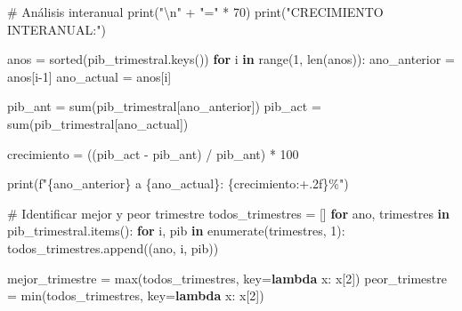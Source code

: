 \documentclass[
  doc,
  floatsintext,
  longtable,
  a4paper,
  nolmodern,
  notxfonts,
  notimes,
  12pt,
  colorlinks=true,linkcolor=blue,citecolor=blue,urlcolor=blue]{apa7}
\newenvironment{Shaded}{\begin{snugshade}}{\end{snugshade}}
\newcommand{\BuiltInTok}[1]{\textcolor[rgb]{0.00,0.23,0.31}{#1}}
\newcommand{\CharTok}[1]{\textcolor[rgb]{0.13,0.47,0.30}{#1}}
\newcommand{\CommentTok}[1]{\textcolor[rgb]{0.37,0.37,0.37}{#1}}
\newcommand{\ControlFlowTok}[1]{\textcolor[rgb]{0.00,0.23,0.31}{\textbf{#1}}}
\newcommand{\DecValTok}[1]{\textcolor[rgb]{0.68,0.00,0.00}{#1}}
\newcommand{\KeywordTok}[1]{\textcolor[rgb]{0.00,0.23,0.31}{\textbf{#1}}}
\newcommand{\NormalTok}[1]{\textcolor[rgb]{0.00,0.23,0.31}{#1}}
\newcommand{\OperatorTok}[1]{\textcolor[rgb]{0.37,0.37,0.37}{#1}}
\newcommand{\SpecialCharTok}[1]{\textcolor[rgb]{0.37,0.37,0.37}{#1}}
\newcommand{\SpecialStringTok}[1]{\textcolor[rgb]{0.13,0.47,0.30}{#1}}
\newcommand{\StringTok}[1]{\textcolor[rgb]{0.13,0.47,0.30}{#1}}
\begin{document}
\begin{Shaded}
\begin{Highlighting}[]
\CommentTok{\# Análisis interanual}
\BuiltInTok{print}\NormalTok{(}\StringTok{"}\CharTok{\textbackslash{}n}\StringTok{"} \OperatorTok{+} \StringTok{"="} \OperatorTok{*} \DecValTok{70}\NormalTok{)}
\BuiltInTok{print}\NormalTok{(}\StringTok{"CRECIMIENTO INTERANUAL:"}\NormalTok{)}

\NormalTok{anos }\OperatorTok{=} \BuiltInTok{sorted}\NormalTok{(pib\_trimestral.keys())}
\ControlFlowTok{for}\NormalTok{ i }\KeywordTok{in} \BuiltInTok{range}\NormalTok{(}\DecValTok{1}\NormalTok{, }\BuiltInTok{len}\NormalTok{(anos)):}
\NormalTok{    ano\_anterior }\OperatorTok{=}\NormalTok{ anos[i}\OperatorTok{{-}}\DecValTok{1}\NormalTok{]}
\NormalTok{    ano\_actual }\OperatorTok{=}\NormalTok{ anos[i]}
    
\NormalTok{    pib\_ant }\OperatorTok{=} \BuiltInTok{sum}\NormalTok{(pib\_trimestral[ano\_anterior])}
\NormalTok{    pib\_act }\OperatorTok{=} \BuiltInTok{sum}\NormalTok{(pib\_trimestral[ano\_actual])}
    
\NormalTok{    crecimiento }\OperatorTok{=}\NormalTok{ ((pib\_act }\OperatorTok{{-}}\NormalTok{ pib\_ant) }\OperatorTok{/}\NormalTok{ pib\_ant) }\OperatorTok{*} \DecValTok{100}
    
    \BuiltInTok{print}\NormalTok{(}\SpecialStringTok{f"}\SpecialCharTok{\{}\NormalTok{ano\_anterior}\SpecialCharTok{\}}\SpecialStringTok{ a }\SpecialCharTok{\{}\NormalTok{ano\_actual}\SpecialCharTok{\}}\SpecialStringTok{: }\SpecialCharTok{\{}\NormalTok{crecimiento}\SpecialCharTok{:+.2f\}}\SpecialStringTok{\%"}\NormalTok{)}

\CommentTok{\# Identificar mejor y peor trimestre}
\NormalTok{todos\_trimestres }\OperatorTok{=}\NormalTok{ []}
\ControlFlowTok{for}\NormalTok{ ano, trimestres }\KeywordTok{in}\NormalTok{ pib\_trimestral.items():}
    \ControlFlowTok{for}\NormalTok{ i, pib }\KeywordTok{in} \BuiltInTok{enumerate}\NormalTok{(trimestres, }\DecValTok{1}\NormalTok{):}
\NormalTok{        todos\_trimestres.append((ano, i, pib))}

\NormalTok{mejor\_trimestre }\OperatorTok{=} \BuiltInTok{max}\NormalTok{(todos\_trimestres, key}\OperatorTok{=}\KeywordTok{lambda}\NormalTok{ x: x[}\DecValTok{2}\NormalTok{])}
\NormalTok{peor\_trimestre }\OperatorTok{=} \BuiltInTok{min}\NormalTok{(todos\_trimestres, key}\OperatorTok{=}\KeywordTok{lambda}\NormalTok{ x: x[}\DecValTok{2}\NormalTok{])}


\end{Highlighting}
\end{Shaded}
\end{document}
